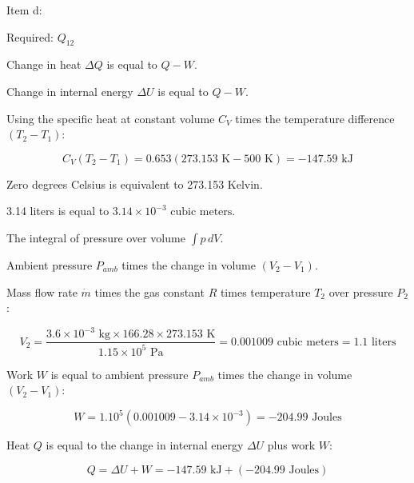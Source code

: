 Item d:

Required: \( Q_{12} \)

Change in heat \( \Delta Q \) is equal to \( Q - W \).

Change in internal energy \( \Delta U \) is equal to \( Q - W \).

Using the specific heat at constant volume \( C_V \) times the temperature difference \( (T_2 - T_1) \):

\[ C_V (T_2 - T_1) = 0.653 (273.153 \text{ K} - 500 \text{ K}) = -147.59 \text{ kJ} \]

Zero degrees Celsius is equivalent to 273.153 Kelvin.

3.14 liters is equal to \( 3.14 \times 10^{-3} \text{ cubic meters} \).

The integral of pressure over volume \( \int p \, dV \).

Ambient pressure \( P_{amb} \) times the change in volume \( (V_2 - V_1) \).

Mass flow rate \( \dot{m} \) times the gas constant \( R \) times temperature \( T_2 \) over pressure \( P_2 \):

\[ V_2 = \frac{3.6 \times 10^{-3} \text{ kg} \times 166.28 \times 273.153 \text{ K}}{1.15 \times 10^5 \text{ Pa}} = 0.001009 \text{ cubic meters} = 1.1 \text{ liters} \]

Work \( W \) is equal to ambient pressure \( P_{amb} \) times the change in volume \( (V_2 - V_1) \):

\[ W = 1.10^5 \left(0.001009 - 3.14 \times 10^{-3}\right) = -204.99 \text{ Joules} \]

Heat \( Q \) is equal to the change in internal energy \( \Delta U \) plus work \( W \):

\[ Q = \Delta U + W = -147.59 \text{ kJ} + (-204.99 \text{ Joules}) \]